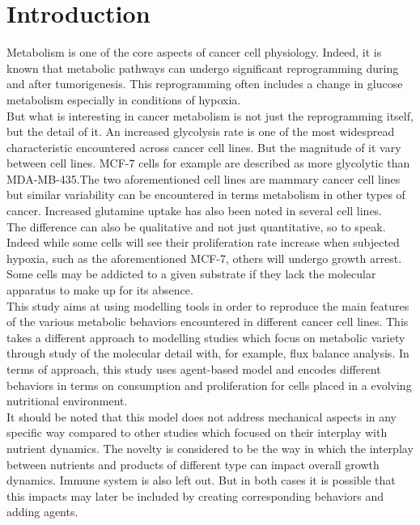 \documentclass[11pt,a4paper]{article}
\begin{document}
\tableofcontents
\section{Introduction}
Metabolism is one of the core aspects of cancer cell physiology. Indeed, it is known that metabolic pathways can undergo significant reprogramming during and after tumorigenesis. This reprogramming often includes a change in glucose metabolism especially in conditions of hypoxia.\cite{Cook2021}\cite{Rodriguez2008}\cite{Griguer2005}\cite{DeBerardinis2008}\cite{Stuart2023}\\

But what is interesting in cancer metabolism is not just the reprogramming itself, but the detail of it. An increased glycolysis rate is one of the most widespread characteristic encountered across cancer cell lines. But the magnitude of it vary between cell lines. MCF-7 cells for example are described as more glycolytic than MDA-MB-435.\cite{Mazurek1997}The two aforementioned cell lines are mammary cancer cell lines but similar variability can be encountered in terms metabolism in other types of cancer.\cite{Kammerer2015} Increased glutamine uptake has also been noted in several cell lines.\cite{Natarajan2019}  \\

The difference can also be qualitative and not just quantitative, so to speak. Indeed while some cells will see their proliferation rate increase when subjected hypoxia, such as the aforementioned MCF-7, others will undergo growth arrest.\cite{Bayar2021}\cite{Waker2018}\cite{Hubbi2015} Some cells may be addicted to a given substrate if they lack the molecular apparatus to make up for its absence.\cite{Jiang2016}\\

This study aims at using modelling tools in order to reproduce the main features of the various metabolic behaviors encountered in different cancer cell lines. This takes a different approach to modelling studies which focus on metabolic variety through study of the molecular detail with, for example, flux balance analysis.\cite{Orth2010}\cite{Ng2022}\cite{Damiani2017} In terms of approach, this study uses agent-based model and encodes different behaviors in terms on consumption and proliferation for cells placed in a evolving nutritional environment.\\

It should be noted that this model does not address mechanical aspects in any specific way compared to other studies which focused on their interplay with nutrient dynamics.\cite{Milotti2010}\cite{Bull2020} The novelty is considered to be the way in which the interplay between nutrients and products of different type can impact overall growth dynamics. Immune system is also left out. But in both cases it is possible that this impacts may later be included by creating corresponding behaviors and adding agents.\\
\end{document}

